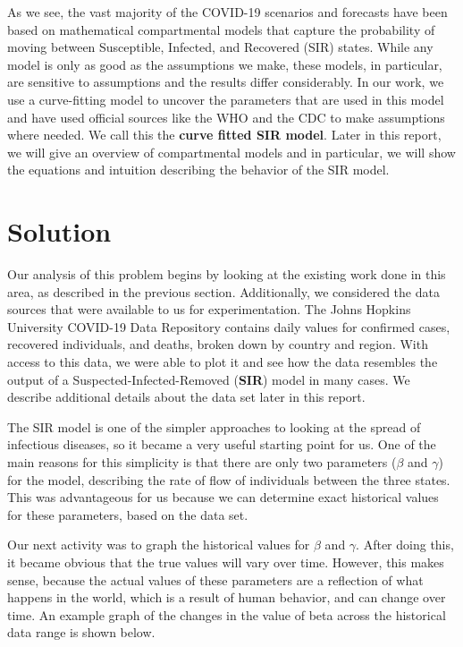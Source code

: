 \documentclass[11pt]{article}
\begin{document}
As we see, the vast majority of the COVID-19 scenarios and forecasts have been based on mathematical compartmental models that capture the probability of moving between Susceptible, Infected, and Recovered (SIR) states. While any model is only as good as the assumptions we make, these models, in particular, are sensitive to assumptions and the results differ considerably. In our work, we use a curve-fitting model to uncover the parameters that are used in this model and have used official sources like the WHO and the CDC to make assumptions where needed. We call this the \textbf{curve fitted SIR model}. Later in this report, we will give an overview of compartmental models and in particular, we will show the equations and intuition describing the behavior of the SIR model.

\section{Solution}

Our analysis of this problem begins by looking at the existing work done in this area, as described in the previous section. Additionally, we considered the data sources that were available to us for experimentation. The Johns Hopkins University COVID-19 Data Repository contains daily values for confirmed cases, recovered individuals, and deaths, broken down by country and region. With access to this data, we were able to plot it and see how the data resembles the output of a Suspected-Infected-Removed (\textbf{SIR}) model in many cases. We describe additional details about the data set later in this report.

The SIR model is one of the simpler approaches to looking at the spread of infectious diseases, so it became a very useful starting point for us. One of the main reasons for this simplicity is that there are only two parameters ($\beta$ and $\gamma$) for the model, describing the rate of flow of individuals between the three states. This was advantageous for us because we can determine exact historical values for these parameters, based on the data set.

Our next activity was to graph the historical values for $\beta$ and $\gamma$. After doing this, it became obvious that the true values will vary over time. However, this makes sense, because the actual values of these parameters are a reflection of what happens in the world, which is a result of human behavior, and can change over time. An example graph of the changes in the value of beta across the historical data range is shown below.
\end{document}
